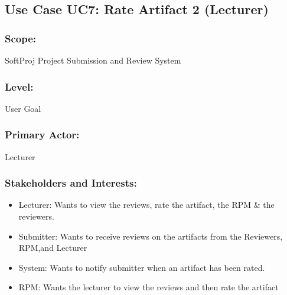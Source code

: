     
    
    
    
    
    
    
    
    
    
    
    
    
    
    
    
    
    
    
    
    
    
    
    
    
    \subsection*{Use Case UC7: Rate Artifact 2 (Lecturer)}
    \subsubsection*{Scope:} SoftProj Project Submission and Review System
    \subsubsection*{\textbf{Level:} }User Goal
    \subsubsection*{\textbf{Primary Actor:} } Lecturer
    \subsubsection*{\textbf{Stakeholders and Interests:}}
    \begin{itemize}
    \itemsep-1em 
        \item Lecturer: Wants to view the reviews, rate the artifact, the RPM \& the reviewers.
        \item Submitter: Wants to receive reviews on the artifacts from the Reviewers, RPM,and Lecturer
         \item System: Wants to notify submitter when an artifact has been rated.
          \item RPM: Wants the lecturer to view the reviews and then rate the artifact
         
    \end{itemize}
    
    
